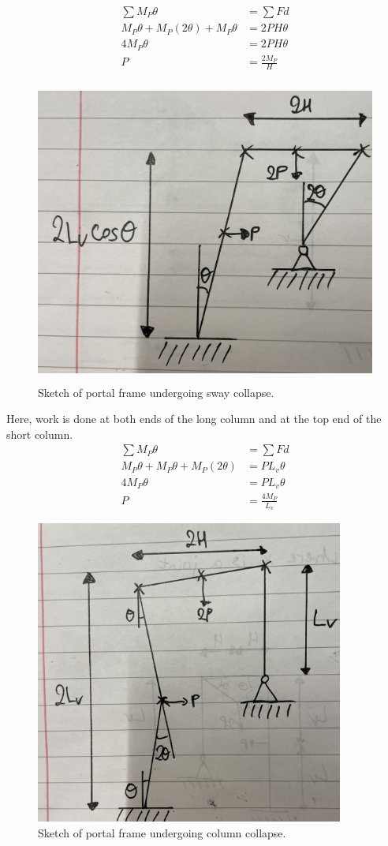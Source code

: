 \documentclass[11pt]{article}
\numberwithin{equation}{section}
\begin{document}
\begin{align}
    \sum M_P \theta &= \sum Fd\\
    M_P \theta + M_P (2\theta) + M_P \theta &= 2P H \theta\\
    4M_P \theta &= 2PH\theta\\
    P &= \frac{2M_P}{H} 
\end{align}
\begin{figure}[H]
    \centering
    \includegraphics[height = 10cm]{./img/q3i3.jpg}
    \caption{Sketch of portal frame undergoing sway collapse.}
\end{figure}
Here, work is done at both ends of the long column and at the top end of the short column.
\begin{align}
    \sum M_P \theta &= \sum Fd\\
    M_P\theta + M_P \theta + M_P (2\theta) &= PL_v \theta\\
    4M_P \theta &= PL_v \theta\\
    P &= \frac{4M_P}{L_v}
\end{align}
\begin{figure}[H]
    \centering
    \includegraphics[height = 10cm]{./img/q3i4.jpg}
    \caption{Sketch of portal frame undergoing column collapse.}
\end{figure}
\end{document}
